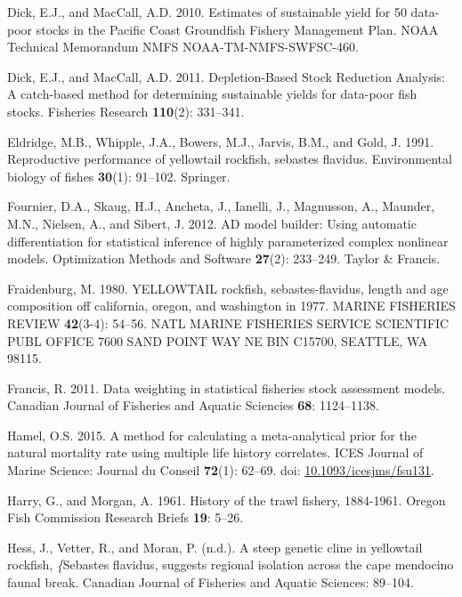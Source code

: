 \documentclass[12pt,]{article}
\begin{document}
\hypertarget{ref-Dick2010}{}
Dick, E.J., and MacCall, A.D. 2010. Estimates of sustainable yield for
50 data-poor stocks in the Pacific Coast Groundfish Fishery Management
Plan. NOAA Technical Memorandum NMFS NOAA-TM-NMFS-SWFSC-460.

\hypertarget{ref-Dick2011}{}
Dick, E.J., and MacCall, A.D. 2011. Depletion-Based Stock Reduction
Analysis: A catch-based method for determining sustainable yields for
data-poor fish stocks. Fisheries Research \textbf{110}(2): 331--341.

\hypertarget{ref-Eldridge1991}{}
Eldridge, M.B., Whipple, J.A., Bowers, M.J., Jarvis, B.M., and Gold, J.
1991. Reproductive performance of yellowtail rockfish, sebastes
flavidus. Environmental biology of fishes \textbf{30}(1): 91--102.
Springer.

\hypertarget{ref-Fournier2012}{}
Fournier, D.A., Skaug, H.J., Ancheta, J., Ianelli, J., Magnusson, A.,
Maunder, M.N., Nielsen, A., and Sibert, J. 2012. AD model builder: Using
automatic differentiation for statistical inference of highly
parameterized complex nonlinear models. Optimization Methods and
Software \textbf{27}(2): 233--249. Taylor \& Francis.

\hypertarget{ref-Fraidenburg1980}{}
Fraidenburg, M. 1980. YELLOWTAIL rockfish, sebastes-flavidus, length and
age composition off california, oregon, and washington in 1977. MARINE
FISHERIES REVIEW \textbf{42}(3-4): 54--56. NATL MARINE FISHERIES SERVICE
SCIENTIFIC PUBL OFFICE 7600 SAND POINT WAY NE BIN C15700, SEATTLE, WA
98115.

\hypertarget{ref-Francis2011}{}
Francis, R. 2011. Data weighting in statistical fisheries stock
assessment models. Canadian Journal of Fisheries and Aquatic Sciencies
\textbf{68}: 1124--1138.

\hypertarget{ref-Hamel2015}{}
Hamel, O.S. 2015. A method for calculating a meta-analytical prior for
the natural mortality rate using multiple life history correlates. ICES
Journal of Marine Science: Journal du Conseil \textbf{72}(1): 62--69.
doi:
\href{https://doi.org/10.1093/icesjms/fsu131}{10.1093/icesjms/fsu131}.

\hypertarget{ref-Harry1961}{}
Harry, G., and Morgan, A. 1961. History of the trawl fishery, 1884-1961.
Oregon Fish Commission Research Briefs \textbf{19}: 5--26.

\hypertarget{ref-Hess2011}{}
Hess, J., Vetter, R., and Moran, P. (n.d.). A steep genetic cline in
yellowtail rockfish, \emph{\{}Sebastes flavidus, suggests regional
isolation across the cape mendocino faunal break. Canadian Journal of
Fisheries and Aquatic Sciences: 89--104.
\end{document}

